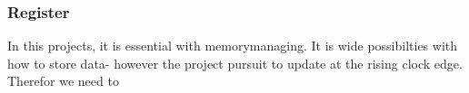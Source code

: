 \subsubsection{Register}
In this projects, it is essential with memorymanaging. It is wide possibilties with how to store data- however the project pursuit to update at the rising clock edge. Therefor we need to